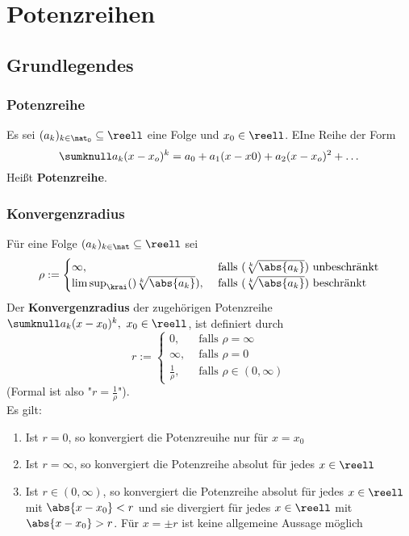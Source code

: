 \documentclass{kit}
\begin{document}
\section{Potenzreihen}
  \subsection{Grundlegendes}
    \subsubsection{Potenzreihe}
      Es sei $(a_k)_{k\in\nat_0}\subseteq\reell$ eine Folge und $x_0\in\reell$. EIne Reihe der Form
      $$\sumknull a_k(x-x_o)^k=a_0+a_1(x-x0)+a_2(x-x_o)^2+\dots$$
      Heißt \textbf{Potenzreihe}.
    \subsubsection{Konvergenzradius}
      Für eine Folge $(a_k)_{k\in\nat}\subseteq\reell$ sei
      $$\rho:=\begin{cases}
        \infty, & \text{ falls }(\sqrt[k]{\abs{a_k}})\text{ unbeschränkt}\\
        \limsup_\krai ()\sqrt[k]{\abs{a_k}}), & \text{ falls } (\sqrt[k]{\abs{a_k}})\text{ beschränkt}
      \end{cases}$$
      Der \textbf{Konvergenzradius} der zugehörigen Potenzreihe $\sumknull a_k(x-x_0)^k,\ x_0\in\reell$, ist definiert durch
      $$r:=\begin{cases}
        0, & \text{ falls }\rho=\infty\\
        \infty, & \text{ falls }\rho=0\\
        \frac{1}{\rho}, & \text{ falls }\rho\in(0,\infty)
      \end{cases}$$
      (Formal ist also "$r=\frac{1}{\rho}$").\\
      Es gilt:
      \begin{enumerate}
        \item Ist $r=0$, so konvergiert die Potenzreuihe nur für $x=x_0$
        \item Ist $r=\infty$, so konvergiert die Potenzreihe absolut für jedes $x\in\reell$
        \item Ist $r\in(0,\infty)$, so konvergiert die Potenzreihe absolut für jedes $x\in\reell$ mit $\abs{x-x_0}<r$ und sie divergiert für jedes $x\in\reell$ mit $\abs{x-x_0}>r$. Für $x=\pm r$ ist keine allgemeine Aussage möglich
      \end{enumerate}
\end{document}
